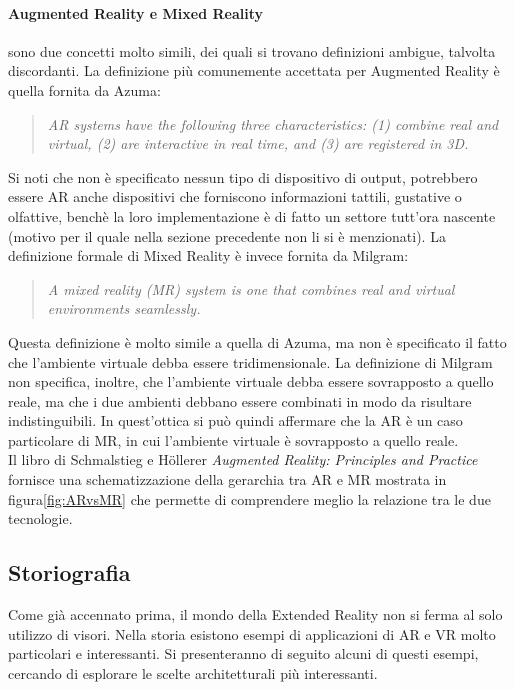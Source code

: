         \paragraph{Augmented Reality e Mixed Reality} sono due concetti molto simili, dei quali si trovano definizioni ambigue, talvolta discordanti. La definizione più comunemente
        accettata per Augmented Reality è quella fornita da Azuma\cite{Azuma1997}:
            \begin{quote}
                \textit{AR systems have the following three characteristics: (1) combine real and virtual, (2) are interactive in real time, and (3) are registered in 3D.}
            \end{quote}
            Si noti che non è specificato nessun tipo di dispositivo di output, potrebbero essere  AR anche dispositivi che forniscono informazioni tattili, gustative o olfattive,
            benchè la loro implementazione è di fatto un settore tutt'ora nascente (motivo per il quale nella sezione precedente non li si è menzionati). La definizione formale di 
            Mixed Reality è invece fornita da Milgram\cite{Milgram1994}:
            \begin{quote}
                \textit{A mixed reality (MR) system is one that combines real and virtual environments seamlessly.}
            \end{quote}
            Questa definizione è molto simile a quella di Azuma, ma non è specificato il fatto che l'ambiente virtuale debba essere tridimensionale. La definizione di Milgram non
            specifica, inoltre, che l'ambiente virtuale debba essere sovrapposto a quello reale, ma che i due ambienti debbano essere combinati in modo da risultare indistinguibili. 
            In quest'ottica si può quindi affermare che la AR è un caso particolare di MR, in cui l'ambiente virtuale è sovrapposto a quello reale.\\
            Il libro di Schmalstieg e Höllerer \textit{Augmented Reality: Principles and Practice}\cite{Schmalstieg2016} fornisce una schematizzazione della gerarchia tra AR e MR
            mostrata in figura\ref{fig:ARvsMR} che permette di comprendere meglio la relazione tra le due tecnologie. 
            
    \subsection{Storiografia}\label{subsec:XRstoriografia}
        Come già accennato prima, il mondo della Extended Reality non si ferma al solo utilizzo di visori. Nella storia esistono esempi di applicazioni di AR e VR molto particolari 
        e interessanti. Si presenteranno di seguito alcuni di questi esempi, cercando di esplorare le scelte architetturali più interessanti.
